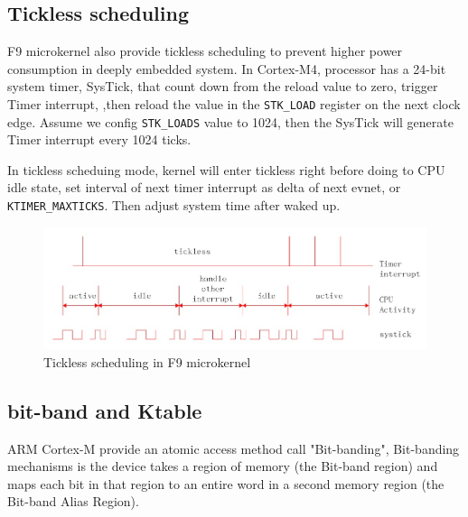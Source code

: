 \documentclass[10pt,preprint,nocopyrightspace]{sigplanconf}
\begin{document}
\subsection{Tickless scheduling}

F9 microkernel also provide tickless scheduling to prevent higher power consumption in deeply embedded system\cite{freertos1,freertos2}. In Cortex-M4, processor has a 24-bit system timer, SysTick, that count down from the reload value to zero, trigger Timer interrupt, ,then reload the value in the \verb|STK_LOAD| register on the next clock edge\cite{st2016manual}. Assume we config \verb|STK_LOADS| value to 1024, then the SysTick will generate Timer interrupt every 1024 ticks.

In tickless scheduing mode, kernel will enter tickless right before doing to CPU idle state, set interval of next timer interrupt as delta of next evnet, or \verb|KTIMER_MAXTICKS|. Then adjust system time after waked up.

\begin{figure}[H]
	\begin{center}
		\includegraphics[width=\linewidth]{picture/tickless.png}
	\end{center}
	\caption{Tickless scheduling in F9 microkernel}
\end{figure}


\subsection{bit-band and Ktable}
ARM Cortex-M provide an atomic access method call "Bit-banding", Bit-banding mechanisms is the device takes a region of memory (the Bit-band region) and maps each bit in that region to an entire word in a second memory region (the Bit-band Alias Region).\cite{schaenzle2013}
\end{document}
